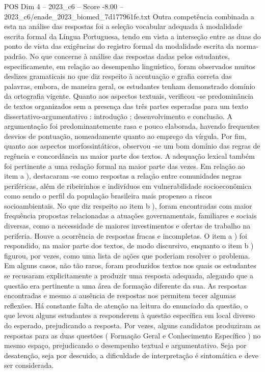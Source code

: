 \begin{textsample}{POS Dim 4 – 2023\_c6 – Score -8.00 – 2023\_c6/enade\_2023\_biomed\_7d177961fe.txt}
Outra competência combinada a esta na análise das respostas foi a seleção vocabular adequada à modalidade escrita formal da Língua Portuguesa, tendo em vista a interseção entre as duas do ponto de vista das exigências do registro formal da modalidade escrita da norma-padrão.
No que concerne à análise das respostas dadas pelos estudantes, especificamente, em relação ao desempenho linguístico, foram observados muitos deslizes gramaticais no que diz respeito à acentuação e grafia correta das palavras, embora, de maneira geral, os estudantes tenham demonstrado domínio da ortografia vigente.
Quanto aos aspectos textuais, verificou -se predominância de textos organizados sem a presença das três partes esperadas para um texto dissertativo-argumentativo : introdução ; desenvolvimento e conclusão.
A argumentação foi predominantemente rasa e pouco elaborada, havendo frequentes desvios de pontuação, nomeadamente quanto ao emprego da vírgula.
Por fim, quanto aos aspectos morfossintáticos, observou -se um bom domínio das regras de regência e concordância na maior parte dos textos.
A adequação lexical também foi pertinente a uma redação formal na maior parte das vezes.
Em relação ao item a ), destacaram -se como respostas a relação entre comunidades negras periféricas, além de ribeirinhos e indivíduos em vulnerabilidade socioeconômica como sendo o perfil da população brasileira mais propenso a riscos socioambientais.
No que diz respeito ao item b ), foram encontradas com maior frequência propostas relacionadas a atuações governamentais, familiares e sociais diversas, como a necessidade de maiores investimentos e ofertas de trabalho na periferia.
Houve a ocorrência de respostas fracas e incompletas.
O item a ) foi respondido, na maior parte dos textos, de modo discursivo, enquanto o item b ) figurou, por vezes, como uma lista de ações que poderiam resolver o problema.
Em alguns casos, não tão raros, foram produzidos textos nos quais os estudantes se recusaram explicitamente a produzir uma resposta adequada, alegando que a questão era pertinente a uma área de formação diferente da sua.
As respostas encontradas e mesmo a ausência de respostas nos permitem tecer algumas reflexões.
Há constante falta de atenção na leitura do enunciado da questão, o que levou alguns estudantes a responderem à questão específica em local diverso do esperado, prejudicando a resposta.
Por vezes, alguns candidatos produziram as respostas para as duas questões ( Formação Geral e Conhecimento Específico ) no mesmo espaço, prejudicando o desempenho textual e argumentativo.
Seja por desatenção, seja por descuido, a dificuldade de interpretação é sintomática e deve ser considerada.

\end{textsample}
